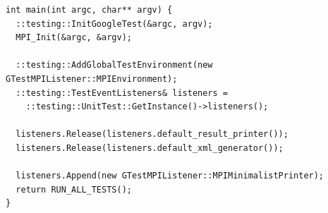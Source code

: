\documentclass{report}
\begin{document}
\begin{lstlisting}
int main(int argc, char** argv) {
  ::testing::InitGoogleTest(&argc, argv);
  MPI_Init(&argc, &argv);

  ::testing::AddGlobalTestEnvironment(new GTestMPIListener::MPIEnvironment);
  ::testing::TestEventListeners& listeners =
    ::testing::UnitTest::GetInstance()->listeners();

  listeners.Release(listeners.default_result_printer());
  listeners.Release(listeners.default_xml_generator());

  listeners.Append(new GTestMPIListener::MPIMinimalistPrinter);
  return RUN_ALL_TESTS();
}


\end{lstlisting}
\end{document}
